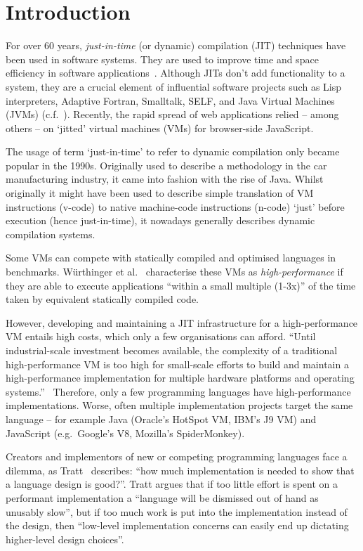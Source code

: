 
\section{Introduction}

For over 60 years, \emph{just-in-time} (or dynamic) compilation (JIT) techniques
have been used in software systems. They are used to improve time and space
efficiency in software applications~\cite{aycock2003brief}. Although JITs don't
add functionality to a system, they are a crucial element of influential
software projects such as Lisp interpreters, Adaptive Fortran, Smalltalk, SELF,
and Java Virtual Machines (JVMs) (c.f.~\cite{arnold2005survey}). Recently, the
rapid spread of web applications relied -- among others -- on `jitted' virtual
machines (VMs) for browser-side JavaScript.

The usage of term `just-in-time' to refer to dynamic compilation only became
popular in the 1990s. Originally used to describe a methodology in the car
manufacturing industry, it came into fashion with the rise of Java. Whilst
originally it might have been used to describe simple translation of VM
instructions (v-code) to native machine-code instructions (n-code) `just' before
execution (hence just-in-time), it nowadays generally describes dynamic
compilation systems.

Some VMs can compete with statically compiled and optimised languages in
benchmarks. W\"urthinger et al.~\cite{wurthinger2013one} characterise these VMs
as \emph{high-performance} if they are able to execute applications ``within a
small multiple (1-3x)'' of the time taken by equivalent statically compiled
code.

However, developing and maintaining a JIT infrastructure for a high-performance
VM entails high costs, which only a few organisations can afford. ``Until
industrial-scale investment becomes available, the complexity of a traditional
high-performance VM is too high for small-scale efforts to build and maintain a
high-performance implementation for multiple hardware platforms and operating
systems.''~\cite{wurthinger2013one}
Therefore, only a few programming languages have high-performance
implementations. Worse, often multiple implementation projects target the same
language -- for example Java (Oracle's HotSpot VM, IBM's J9 VM) and JavaScript
(e.g.~Google's V8, Mozilla's SpiderMonkey).

Creators and implementors of new or competing programming languages face a
dilemma, as Tratt~\cite{tratt_fast_enough} describes: ``how much implementation
is needed to show that a language design is good?''. Tratt argues that if too
little effort is spent on a performant implementation a ``language will be
dismissed out of hand as unusably slow'', but if too much work is put into the
implementation instead of the design, then ``low-level implementation concerns
can easily end up dictating higher-level design choices''.


